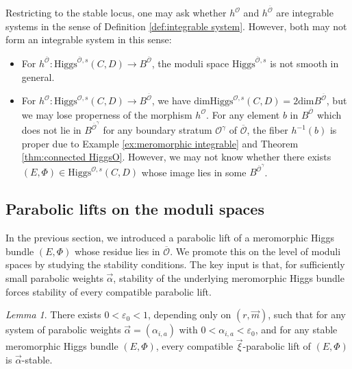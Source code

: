 \documentclass[11pt]{amsart}
\theoremstyle{plain}
\theoremstyle{definition}
\theoremstyle{remark}
\newtheorem{lemma}[theorem]{Lemma}
\newcommand{\ov}[1]{\overline{#1}}
\newcommand{\cO}{\mathcal O}
\newcommand{\Higgs}{\mathrm{Higgs}}
\def\dim{\mathrm{dim}}
\begin{document}
Restricting to the stable locus, one may ask whether $h^{\cO}$ and $h^{\ov\cO}$ are integrable systems in the sense of Definition \ref{def:integrable system}. However, both may not form an integrable system in this sense:
\begin{itemize}
    \item For $h^{\ov\cO}:\Higgs^{\ov\cO,s}(C,D) \to B^{\ov\cO}$, the moduli space $\Higgs^{\ov\cO,s}$ is not smooth in general. 
    \item For $h^{\cO}:\Higgs^{\cO,s}(C,D) \to B^{\ov\cO}$, we have $\dim \Higgs^{\cO,s}(C,D)=2\dim B^{\ov\cO}$,
    but we may lose properness of the morphism $h^{\cO}$. For any element $b$ in $B^{\ov\cO}$ which does not lie in $B^{\ov\cO^\gamma}$ for any boundary stratum $\cO^\gamma$ of $\ov\cO$, the fiber $h^{-1}(b)$ is proper due to Example \ref{ex:meromorphic integrable} and Theorem \ref{thm:connected HiggsO}. However, we may not know whether there exists $(E,\Phi) \in \Higgs^{\cO,s}(C,D)$ whose image lies in some $B^{\ov\cO^{\gamma}}$. 
\end{itemize}

\subsection{Parabolic lifts on the moduli spaces}\label{sec:parlift}

In the previous section, we introduced a parabolic lift of a meromorphic Higgs bundle $(E,\Phi)$ whose residue lies in $\ov\cO$. We promote this on the level of moduli spaces by studying the stability conditions. The key input is that, for sufficiently small parabolic weights $\vec\alpha$, stability of the underlying meromorphic Higgs bundle forces stability of every compatible parabolic lift.

\begin{lemma}\label{lem:small-weights}
There exists $0<\varepsilon_0<1$, depending only on $(r,\vec m)$, such that for any system of parabolic weights $\vec\alpha=(\alpha_{i,a})$ with $0<\alpha_{i,a}<\varepsilon_0$, and for any stable meromorphic Higgs bundle $(E,\Phi)$, every compatible $\vec\xi$-parabolic lift of $(E,\Phi)$ is $\vec\alpha$-stable.
\end{lemma}
\end{document}
